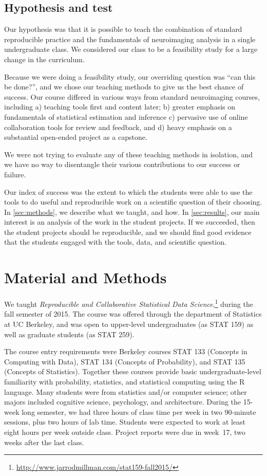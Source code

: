 \subsection{Hypothesis and test}

Our hypothesis was that it is possible to teach the combination of standard
reproducible practice and the fundamentals of neuroimaging analysis in a
single undergraduate class.  We considered our class to be a feasibility study
for a large change in the curriculum.

Because we were doing a feasibility study, our overriding question was ``can
this be done?'', and we chose our teaching methods to give us the best chance
of success.  Our course differed in various ways from standard neuroimaging
courses, including a) teaching tools first and content later; b) greater
emphasis on fundamentals of statistical estimation and inference c) pervasive
use of online collaboration tools for review and feedback, and d) heavy
emphasis on a substantial open-ended project as a capstone.

We were not trying to evaluate any of these teaching methods in isolation, and
we have no way to disentangle their various contributions to our success or
failure.

Our index of success was the extent to which the students were able to use the
tools to do useful and reproducible work on a scientific question of their
choosing.  In \ref{sec:methods}, we describe what we taught, and how.  In
\ref{sec:results}, our main interest is an analysis of the work in the student
projects.  If we succeeded, then the student projects should be reproducible,
and we should find good evidence that the students engaged with the tools,
data, and scientific question.

\section{Material and Methods}\label{methods}

We taught \emph{Reproducible and Collaborative Statistical Data
Science},\footnote{\url{http://www.jarrodmillman.com/stat159-fall2015/}} during
the fall semester of 2015.  The course was offered through the department of
Statistics at UC Berkeley, and was open to upper-level undergraduates (as STAT
159) as well as graduate students (as STAT 259).

The course entry requirements were Berkeley courses STAT 133 (Concepts in
Computing with Data), STAT 134 (Concepts of Probability), and STAT 135
(Concepts of Statistics).  Together these courses provide basic
undergraduate-level familiarity with probability, statistics, and statistical
computing using the R language.
Many students were from statistics and/or computer science; other majors
included cognitive science, psychology, and architecture.
During the 15-week long semester, we had three hours of class time per week in
two 90-minute sessions, plus two hours of lab time.  Students were expected to
work at least eight hours per week outside class.  Project reports were due in
week~17, two weeks after the last class.

